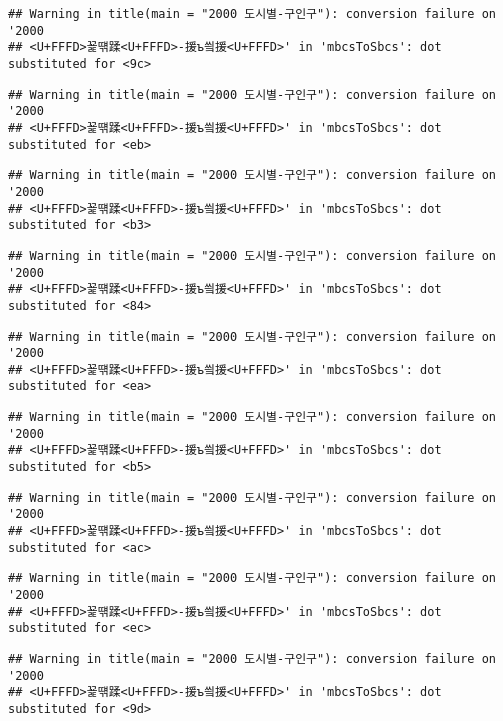 \documentclass[]{article}
\begin{document}
\begin{verbatim}
## Warning in title(main = "2000 도시별-구인구"): conversion failure on '2000
## <U+FFFD>꾩떆蹂<U+FFFD>-援ъ씤援<U+FFFD>' in 'mbcsToSbcs': dot substituted for <9c>
\end{verbatim}

\begin{verbatim}
## Warning in title(main = "2000 도시별-구인구"): conversion failure on '2000
## <U+FFFD>꾩떆蹂<U+FFFD>-援ъ씤援<U+FFFD>' in 'mbcsToSbcs': dot substituted for <eb>
\end{verbatim}

\begin{verbatim}
## Warning in title(main = "2000 도시별-구인구"): conversion failure on '2000
## <U+FFFD>꾩떆蹂<U+FFFD>-援ъ씤援<U+FFFD>' in 'mbcsToSbcs': dot substituted for <b3>
\end{verbatim}

\begin{verbatim}
## Warning in title(main = "2000 도시별-구인구"): conversion failure on '2000
## <U+FFFD>꾩떆蹂<U+FFFD>-援ъ씤援<U+FFFD>' in 'mbcsToSbcs': dot substituted for <84>
\end{verbatim}

\begin{verbatim}
## Warning in title(main = "2000 도시별-구인구"): conversion failure on '2000
## <U+FFFD>꾩떆蹂<U+FFFD>-援ъ씤援<U+FFFD>' in 'mbcsToSbcs': dot substituted for <ea>
\end{verbatim}

\begin{verbatim}
## Warning in title(main = "2000 도시별-구인구"): conversion failure on '2000
## <U+FFFD>꾩떆蹂<U+FFFD>-援ъ씤援<U+FFFD>' in 'mbcsToSbcs': dot substituted for <b5>
\end{verbatim}

\begin{verbatim}
## Warning in title(main = "2000 도시별-구인구"): conversion failure on '2000
## <U+FFFD>꾩떆蹂<U+FFFD>-援ъ씤援<U+FFFD>' in 'mbcsToSbcs': dot substituted for <ac>
\end{verbatim}

\begin{verbatim}
## Warning in title(main = "2000 도시별-구인구"): conversion failure on '2000
## <U+FFFD>꾩떆蹂<U+FFFD>-援ъ씤援<U+FFFD>' in 'mbcsToSbcs': dot substituted for <ec>
\end{verbatim}

\begin{verbatim}
## Warning in title(main = "2000 도시별-구인구"): conversion failure on '2000
## <U+FFFD>꾩떆蹂<U+FFFD>-援ъ씤援<U+FFFD>' in 'mbcsToSbcs': dot substituted for <9d>
\end{verbatim}
\end{document}
